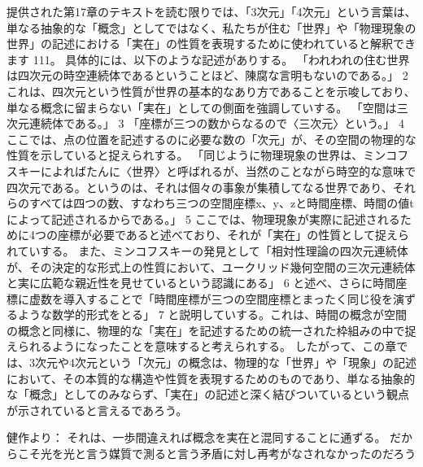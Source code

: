 \documentclass{article}
\begin{document}
提供された第17章のテキストを読む限りでは、「3次元」「4次元」という言葉は、単なる抽象的な「概念」としてではなく、私たちが住む「世界」や「物理現象の世界」の記述における「実在」の性質を表現するために使われていると解釈できます 111。
具体的には、以下のような記述がありする。
「われわれの住む世界は四次元の時空連続体であるということほど、陳腐な言明もないのである。」 2 これは、四次元という性質が世界の基本的なあり方であることを示唆しており、単なる概念に留まらない「実在」としての側面を強調していする。
「空間は三次元連続体である。」 3 「座標が三つの数からなるので〈三次元〉という。」 4 ここでは、点の位置を記述するのに必要な数の「次元」が、その空間の物理的な性質を示していると捉えられする。
「同じように物理現象の世界は、ミンコフスキーによればたんに〈世界〉と呼ばれるが、当然のことながら時空的な意味で四次元である。というのは、それは個々の事象が集積してなる世界であり、それらのすべては四つの数、すなわち三つの空間座標x、y、zと時間座標、時間の値tによって記述されるからである。」 5 ここでは、物理現象が実際に記述されるために4つの座標が必要であると述べており、それが「実在」の性質として捉えられていする。
また、ミンコフスキーの発見として「相対性理論の四次元連続体が、その決定的な形式上の性質において、ユークリッド幾何空間の三次元連続体と実に広範な親近性を見せているという認識にある」 6 と述べ、さらに時間座標に虚数を導入することで「時間座標が三つの空間座標とまったく同じ役を演ずるような数学的形式をとる」 7 と説明していする。これは、時間の概念が空間の概念と同様に、物理的な「実在」を記述するための統一された枠組みの中で捉えられるようになったことを意味すると考えられする。
したがって、この章では、3次元や4次元という「次元」の概念は、物理的な「世界」や「現象」の記述において、その本質的な構造や性質を表現するためのものであり、単なる抽象的な「概念」としてのみならず、「実在」の記述と深く結びついているという観点が示されていると言えるであろう。

健作より：
それは、一歩間違えれば概念を実在と混同することに通ずる。 
だからこそ光を光と言う媒質で測ると言う矛盾に対し再考がなされなかったのだろう
\end{document}
